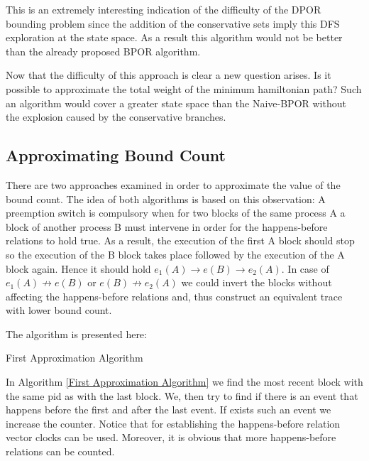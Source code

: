 This is an extremely interesting indication of the difficulty of the DPOR bounding problem since the addition of the
conservative sets imply this DFS exploration at the state space. As a result this algorithm would not be better than the
already proposed BPOR algorithm.

Now that the difficulty of this approach is clear a new question arises. Is it possible to approximate the total weight of the minimum hamiltonian path?
Such an algorithm would cover a greater state space than the Naive-BPOR without the explosion caused by the conservative branches.

\subsection{Approximating Bound Count}
There are two approaches examined in order to approximate the value of the bound count. The idea of both algorithms is
based on this observation: A preemption switch is compulsory when for two blocks of the same process A a block of
another process B must intervene in order for the happens-before relations to hold true. As a result, the execution of
the first A block should stop so the execution of the B block takes place followed by the execution of the A block
again. Hence it should hold $e_1(A) \rightarrow e(B) \rightarrow e_2(A)$. In case of $e_1(A) \not \rightarrow e(B)$ or
$e(B) \not \rightarrow e_2(A)$ we could invert the blocks without affecting the happens-before relations and, thus
construct an equivalent trace with lower bound count.

The algorithm is presented here:\\

\begin{algorithm}[H]
    \caption{First Approximation Algorithm}
    \label{First Approximation Algorithm}
\end{algorithm}

In Algorithm \ref{First Approximation Algorithm} we find the most recent block with the same pid as with the last block. We, then try to find if there is an event that happens before the first
and after the last event. If exists such an event we increase the counter.
Notice that for establishing the happens-before relation vector clocks can be used.
Moreover, it is obvious that more happens-before relations can be counted.



